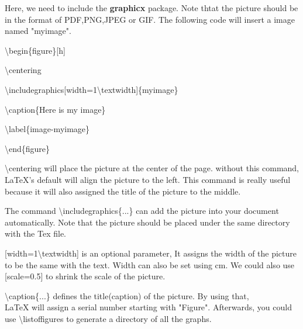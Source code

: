 \documentclass[a4paper,12pt]{article}
\begin{document}
    Here, we need to include the \textbf{graphicx} package.
    Note thtat the picture should be in the format
    of PDF,PNG,JPEG or GIF. The following code will
    insert a image named "myimage".

    \textbackslash begin\{figure\}[h]

    \textbackslash centering

    \textbackslash includegraphics[width=1\textbackslash textwidth]\{myimage\}

    \textbackslash caption\{Here is my image\}

    \textbackslash label\{image-myimage\}

    \textbackslash end\{figure\}


    \textbackslash centering will place the picture at the center of the page.
    without this command, LaTeX's default will align the picture to the left.
    This command is really useful because it will also
    assigned the title of the picture to the middle.

    The command \textbackslash includegraphics\{...\} 
    can add the picture into your document automatically.
    Note that the picture should be placed under the same 
    directory with the Tex file.

    [width=1\textbackslash textwidth] is an optional parameter,
    It assigns the width of the picture to be the same with the
    text. Width can also be set using cm.
    We could also use [scale=0.5] to shrink the scale of the picture.

    \textbackslash caption\{...\} defines the title(caption) of the picture. 
    By using that,\\LaTeX will assign a serial number starting with "Figure".
    Afterwards, you could use  \textbackslash listoffigures to generate a 
    directory of all the graphs.
\end{document}
